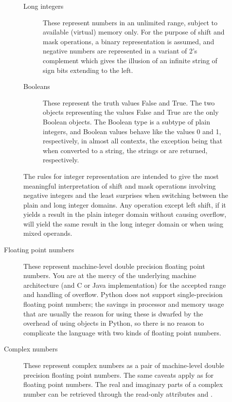 \begin{description}
\begin{description}
\begin{description}
\item[Long integers]
These represent numbers in an unlimited range, subject to available
(virtual) memory only.  For the purpose of shift and mask operations,
a binary representation is assumed, and negative numbers are
represented in a variant of 2's complement which gives the illusion of
an infinite string of sign bits extending to the left.

\item[Booleans]
These represent the truth values False and True.  The two objects
representing the values False and True are the only Boolean objects.
The Boolean type is a subtype of plain integers, and Boolean values
behave like the values 0 and 1, respectively, in almost all contexts,
the exception being that when converted to a string, the strings
 or  are returned, respectively.

\end{description} %

The rules for integer representation are intended to give the most
meaningful interpretation of shift and mask operations involving
negative integers and the least surprises when switching between the
plain and long integer domains.  Any operation except left shift,
if it yields a result in the plain integer domain without causing
overflow, will yield the same result in the long integer domain or
when using mixed operands.

\item[Floating point numbers]
These represent machine-level double precision floating point numbers.  
You are at the mercy of the underlying machine architecture (and
C or Java implementation) for the accepted range and handling of overflow.
Python does not support single-precision floating point numbers; the
savings in processor and memory usage that are usually the reason for using
these is dwarfed by the overhead of using objects in Python, so there
is no reason to complicate the language with two kinds of floating
point numbers.

\item[Complex numbers]
These represent complex numbers as a pair of machine-level double
precision floating point numbers.  The same caveats apply as for
floating point numbers.  The real and imaginary parts of a complex
number  can be retrieved through the read-only attributes
 and .


\end{description}
\end{description}
